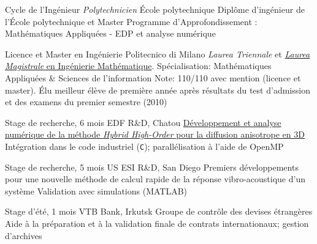 \documentclass[french]{RMcv}
\begin{document}


%
%
        {Cycle de l'Ing\'enieur \textit{Polytechnicien}}%
        {\'Ecole polytechnique}%
        {Dipl\^ome d'ing\'enieur de l'\'Ecole polytechnique et Master}%
        {Programme d'Approfondissement : Math\'ematiques Appliqu\'ees - EDP et analyse num\'erique}


%
%
        {Licence et Master en Ing\'enierie}%
        {Politecnico di Milano}%
        {\emph{Laurea Triennale} et \href{\tesilink}{\emph{Laurea Magistrale} en Ing\'enierie Math\'ematique}. Sp\'ecialisation: Math\'ematiques Appliqu\'ees \& Sciences de l'information}%
        {Note: 110/110 avec mention (licence et master). \'Elu meilleur \'el\`eve de premi\`ere ann\'ee apr\`es r\'esultats du test d'admission et des examens du premier semestre (2010)}

\vspace{8pt}


%
%
        {Stage de recherche, 6 mois}%
        {EDF R\&D, Chatou}%
        {\href{\tesilink}{D\'eveloppement et analyse num\'erique de la m\'ethode \emph{Hybrid High-Order} pour la diffusion anisotrope en 3D}}%
        {Int\'egration dans le code industriel \cs{} (\texttt{C}); parall\'elisation \`a l'aide de OpenMP}


%
%
        {Stage de recherche, 5 mois}%
        {US ESI R\&D, San Diego}%
        {Premiers d\'eveloppements pour une nouvelle m\'ethode de calcul rapide de la r\'eponse vibro-acoustique d'un syst\`eme}%
        {Validation avec simulations (MATLAB)}


%
%
        {Stage d'\'et\'e, 1 mois}%
        {VTB Bank, Irkutsk}%
        {Groupe de contr\^ole des devises \'etrang\`eres}%
        {Aide \`a la pr\'eparation et \`a la validation finale de contrats internationaux; gestion d'archives}
\end{document}
